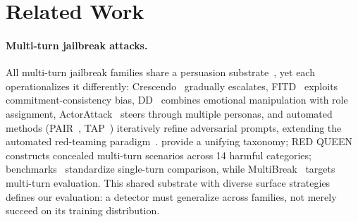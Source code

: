 
\section{Related Work}

\paragraph{Multi-turn jailbreak attacks.}
All multi-turn jailbreak families share a persuasion substrate~\citep{zeng2024pap,hagendorff2026reasoning,li2024mhj}, yet each operationalizes it differently: Crescendo~\citep{russinovich2024crescendo} gradually escalates, FITD~\citep{fitd2024} exploits commitment-consistency bias, DD~\citep{deceptivedelight2024} combines emotional manipulation with role assignment, ActorAttack~\citep{ren2024actorattack} steers through multiple personas, and automated methods (PAIR~\citep{chao2023pair}, TAP~\citep{mehrotra2024tap}) iteratively refine adversarial prompts, extending the automated red-teaming paradigm~\citep{perez2022redteaming}. \citet{wei2023jailbroken} provide a unifying taxonomy; RED QUEEN~\citep{jiang2024redqueen} constructs concealed multi-turn scenarios across 14 harmful categories; benchmarks~\citep{mazeika2024harmbench,chao2024jailbreakbench} standardize single-turn comparison, while MultiBreak~\citep{song2026multibreak} targets multi-turn evaluation. This shared substrate with diverse surface strategies defines our evaluation: a detector must generalize across families, not merely succeed on its training distribution.

